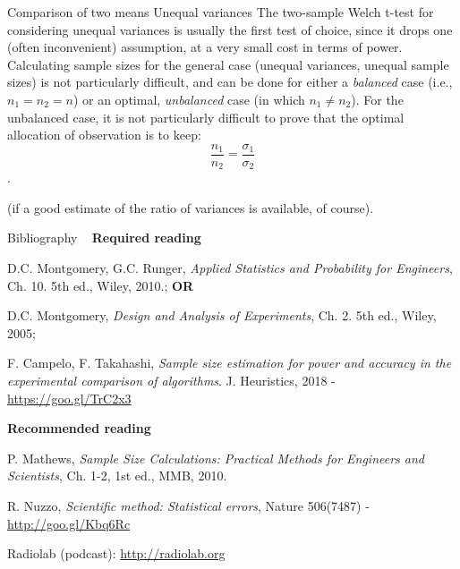 \documentclass[t]{beamer}
\begin{document}
\begin{ftst}
{Comparison of two means}
{Unequal variances}
The two-sample Welch t-test for considering unequal variances is usually the first test of choice, since it drops one (often inconvenient) assumption, at a very small cost in terms of power.
\vone
Calculating sample sizes for the general case (unequal variances, unequal sample sizes) is not particularly difficult, and can be done for either a \textit{balanced} case (i.e., $n_1 = n_2 = n$) or an optimal, \textit{unbalanced} case (in which $n_1 \neq n_2$).
\vone
For the unbalanced case, it is not particularly difficult to prove that the optimal allocation of observation is to keep:
$$\frac{n_1}{n_2} = \frac{\sigma_1}{\sigma_2}$$.

(if a good estimate of the ratio of variances is available, of course).
\end{ftst}


\begin{ftst}
{Bibliography}
{\ }
\scriptsize
\textbf{Required reading}

\benums D.C. Montgomery, G.C. Runger, \textit{Applied Statistics and Probability for Engineers}, Ch. 10. 5th ed., Wiley, 2010.; \textbf{OR}
\item D.C. Montgomery, \textit{Design and Analysis of Experiments}, Ch. 2. 5th ed., Wiley, 2005;
\item F. Campelo, F. Takahashi, \textit{Sample size estimation for power and accuracy in the experimental comparison of algorithms}. J. Heuristics, 2018 - \url{https://goo.gl/TrC2x3}
\eenum

\textbf{Recommended reading}

\benums P. Mathews, \textit{Sample Size Calculations: Practical Methods for Engineers and Scientists}, Ch. 1-2, 1st ed., MMB, 2010.
\item R. Nuzzo, \textit{Scientific method: Statistical errors}, Nature 506(7487) - \url{http://goo.gl/Kbq6Rc}
\item Radiolab (podcast): \url{http://radiolab.org}
\eenum
\end{ftst}




\end{document}
